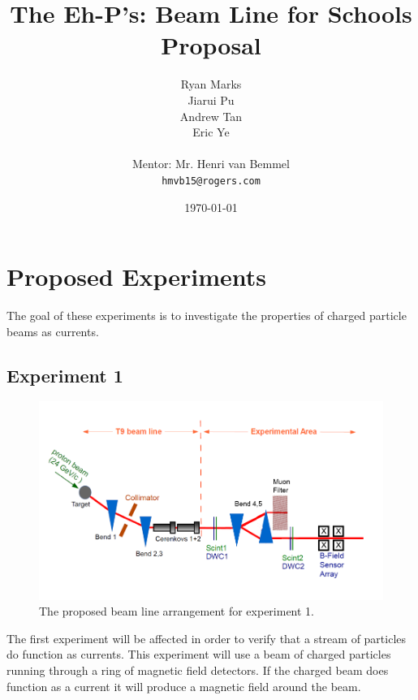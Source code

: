 \documentclass[12pt,letterpaper]{article}
\begin{document}
\title{The Eh-P's: Beam Line for Schools Proposal}
\author{
Ryan Marks\\
Jiarui Pu \\ 
Andrew Tan\\
Eric Ye\\
\\
Mentor: Mr. Henri van Bemmel\\
\normalsize{\texttt{hmvb15@rogers.com}}
}

\date{\today}
\maketitle
\section{Proposed Experiments}
The goal of these experiments is to investigate the properties of charged particle beams as currents.

\subsection{Experiment 1}
\begin{figure}[H]
\label{experiment_setup1}
  \centering
\includegraphics[]{experimental_setup1.png}
 \caption{The proposed beam line arrangement for experiment 1.}
\end{figure}
The first experiment will be affected in order to verify that a stream of particles do function as currents.
This experiment will use a beam of charged particles running through a ring of magnetic field detectors.
If the charged beam does function as a current it will produce a magnetic field around the beam.
\end{document}
